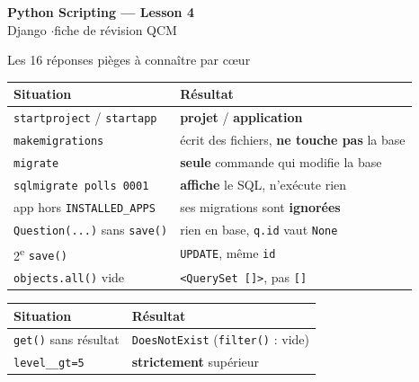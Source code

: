 \documentclass[a4paper,10pt]{article}
\newcommand{\co}[1]{\texttt{\textcolor{codefg}{#1}}}
\begin{document}

\small

\begin{center}
  {\LARGE\bfseries\color{accent} Python Scripting --- Lesson 4}\\[0.3em]
  {\normalsize Django \quad$\cdot$\quad fiche de révision QCM}
\end{center}
\vspace{0.4em}

\begin{piegebox}{Les 16 réponses pièges à connaître par c\oe ur}
\begin{minipage}[t]{0.485\linewidth}
\begin{tabularx}{\linewidth}{@{}l>{\raggedright\arraybackslash}X@{}}
\toprule
\textbf{Situation} & \textbf{Résultat} \\
\midrule
\co{startproject} / \co{startapp} & \textbf{projet} / \textbf{application} \\
\co{makemigrations}       & écrit des fichiers, \textbf{ne touche pas} la base \\
\co{migrate}              & \textbf{seule} commande qui modifie la base \\
\co{sqlmigrate polls 0001}& \textbf{affiche} le SQL, n'exécute rien \\
app hors \co{INSTALLED\_APPS} & ses migrations sont \textbf{ignorées} \\
\co{Question(...)} sans \co{save()} & rien en base, \co{q.id} vaut \co{None} \\
2\textsuperscript{e} \co{save()}      & \co{UPDATE}, même \co{id} \\
\co{objects.all()} vide   & \co{<QuerySet []>}, pas \co{[]} \\
\bottomrule
\end{tabularx}
\end{minipage}\hfill
\begin{minipage}[t]{0.485\linewidth}
\begin{tabularx}{\linewidth}{@{}l>{\raggedright\arraybackslash}X@{}}
\toprule
\textbf{Situation} & \textbf{Résultat} \\
\midrule
\co{get()} sans résultat  & \co{DoesNotExist} (\co{filter()} : vide) \\
\co{level\_\_gt=5}        & \textbf{strictement} supérieur \\

\end{tabularx}
\end{minipage}
\end{piegebox}
\end{document}
